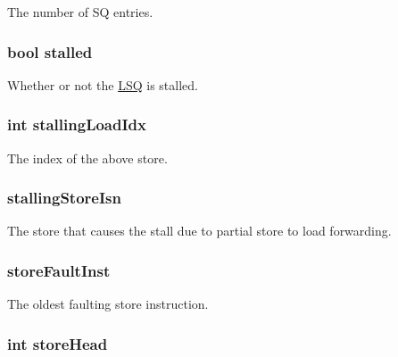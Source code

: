 \label{classOzoneLSQ_a38c8af5392da70119dc5cce4e3637cbc}
The number of SQ entries. \hypertarget{classOzoneLSQ_a6f8bff553ad30865c7d0c62e05421eb8}{
\subsubsection[{stalled}]{\setlength{\rightskip}{0pt plus 5cm}bool {\bf stalled}}}
\label{classOzoneLSQ_a6f8bff553ad30865c7d0c62e05421eb8}
Whether or not the \hyperlink{classLSQ}{LSQ} is stalled. \hypertarget{classOzoneLSQ_af55bc9000c8b4e4cfcfbd018feca12a7}{
\subsubsection[{stallingLoadIdx}]{\setlength{\rightskip}{0pt plus 5cm}int {\bf stallingLoadIdx}}}
\label{classOzoneLSQ_af55bc9000c8b4e4cfcfbd018feca12a7}
The index of the above store. \hypertarget{classOzoneLSQ_afe1cdcfca6b44c28581d862228adc3da}{
\subsubsection[{stallingStoreIsn}]{ {\bf stallingStoreIsn}}}
\label{classOzoneLSQ_afe1cdcfca6b44c28581d862228adc3da}
The store that causes the stall due to partial store to load forwarding. \hypertarget{classOzoneLSQ_ab98cf7d5235b7402e8916e78569f4ab2}{
\subsubsection[{storeFaultInst}]{ {\bf storeFaultInst}}}
\label{classOzoneLSQ_ab98cf7d5235b7402e8916e78569f4ab2}
The oldest faulting store instruction. \hypertarget{classOzoneLSQ_a6e87b6f77102183080ea6ab8599b26a9}{
\subsubsection[{storeHead}]{\setlength{\rightskip}{0pt plus 5cm}int {\bf storeHead}}}
